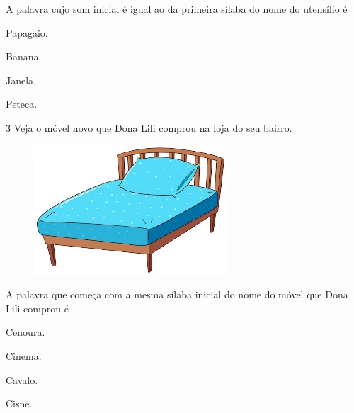 
A palavra cujo som inicial é igual ao da primeira sílaba do nome do utensílio é

\begin{multicols}{2}
\begin{escolha}
\item Papagaio.

\item Banana.

\item Janela.

\item Peteca.
\end{escolha}
\end{multicols}

\pagebreak
\num{3} Veja o móvel novo que Dona Lili comprou na loja do seu bairro.

\begin{figure}[htpb!]
\centering
\includegraphics[width=.5\textwidth]{media/image140.jpeg}
\end{figure}


A palavra que começa com a mesma sílaba inicial do nome do móvel que Dona Lili comprou é

\begin{multicols}{2}
\begin{escolha}
\item Cenoura.

\item Cinema.

\item Cavalo.

\item Cisne.
\end{escolha}
\end{multicols}

